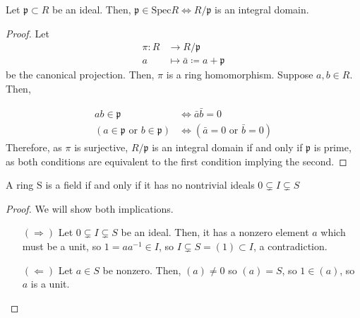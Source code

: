         \begin{prop}
            Let $\mathfrak{p} \subset R$ be an ideal.
            Then, $\mathfrak{p} \in \text{Spec}R \Leftrightarrow R/\mathfrak{p}$ is an integral domain.
        \end{prop}
            \begin{proof}
                Let \begin{align}
                    \pi: R &\rightarrow R/\mathfrak{p} \nonumber \\
                        a &\mapsto \bar{a} \coloneqq a + \mathfrak{p} \nonumber
                \end{align}
                be the canonical projection.
                Then, $\pi$ is a ring homomorphism.
                Suppose $a, b \in R$.
                Then,

                \begin{align}
                    ab \in \mathfrak{p} &\Leftrightarrow \bar{a}\bar{b} = 0 \nonumber \\
                    (a \in \mathfrak{p} \text{ or } b \in \mathfrak{p}) &\Leftrightarrow (\bar{a} = 0 \text{ or } \bar{b} = 0) \nonumber
                \end{align}
                Therefore, as $\pi$ is surjective, $R/\mathfrak{p}$ is an integral domain if and only if $\mathfrak{p}$ is prime,
                as both conditions are equivalent to the first condition implying the second.
            \end{proof}

        \begin{lemma}
                     A ring S is a field if and only if it has no nontrivial ideals $ 0 \subsetneq I \subsetneq S$
        \end{lemma}
                \begin{proof}
                    We will show both implications.

                    \begin{itemize}
                        \item [$(\Rightarrow)$] Let $ 0 \subsetneq I \subsetneq S$ be an ideal.
                        Then, it has a nonzero element $a$ which must be a unit, so
                        $1 = a a^{-1} \in I$, so $I \subsetneq S = (1) \subset I$, a contradiction.

                        \item[$(\Leftarrow)$] Let $a \in S$ be nonzero.
                        Then, $(a) \neq 0$ so $(a) = S$, so $1 \in (a)$, so $a$ is a unit.
                    \end{itemize}

                \end{proof}

